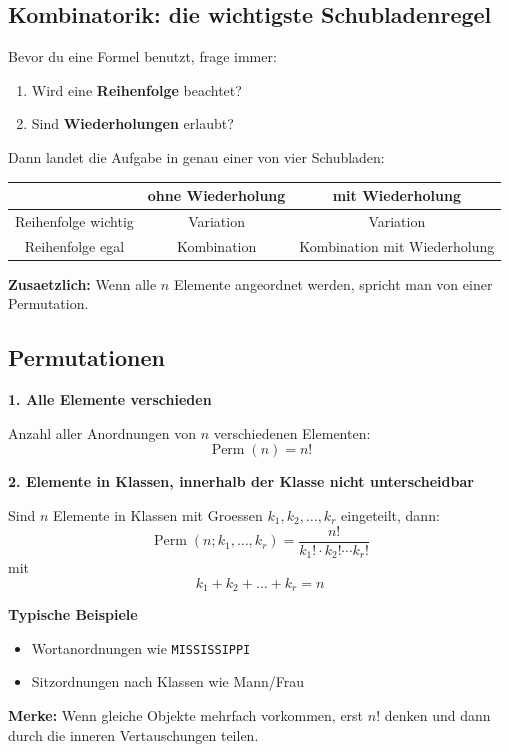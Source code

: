 \documentclass[a4paper,11pt]{article}
\begin{document}
\subsection{Kombinatorik: die wichtigste Schubladenregel}
Bevor du eine Formel benutzt, frage immer:
\begin{enumerate}
  \item Wird eine \textbf{Reihenfolge} beachtet?
  \item Sind \textbf{Wiederholungen} erlaubt?
\end{enumerate}

Dann landet die Aufgabe in genau einer von vier Schubladen:

\begin{center}
\begin{tabular}{|c|c|c|}
\hline
 & ohne Wiederholung & mit Wiederholung \\
\hline
Reihenfolge wichtig & Variation & Variation \\
\hline
Reihenfolge egal & Kombination & Kombination mit Wiederholung \\
\hline
\end{tabular}
\end{center}

\textbf{Zusaetzlich:} Wenn alle $n$ Elemente angeordnet werden, spricht man von einer Permutation.

\subsection{Permutationen}
\textbf{1. Alle Elemente verschieden}

Anzahl aller Anordnungen von $n$ verschiedenen Elementen:
\[
\operatorname{Perm}(n) = n!
\]

\textbf{2. Elemente in Klassen, innerhalb der Klasse nicht unterscheidbar}

Sind $n$ Elemente in Klassen mit Groessen $k_1, k_2, \dots, k_r$ eingeteilt, dann:
\[
\operatorname{Perm}(n;k_1,\dots,k_r) = \frac{n!}{k_1!\cdot k_2!\cdots k_r!}
\]
mit
\[
k_1 + k_2 + \dots + k_r = n
\]

\textbf{Typische Beispiele}
\begin{itemize}
  \item Wortanordnungen wie \texttt{MISSISSIPPI}
  \item Sitzordnungen nach Klassen wie Mann/Frau
\end{itemize}

\textbf{Merke:}
Wenn gleiche Objekte mehrfach vorkommen, erst $n!$ denken und dann durch die inneren Vertauschungen teilen.
\end{document}
